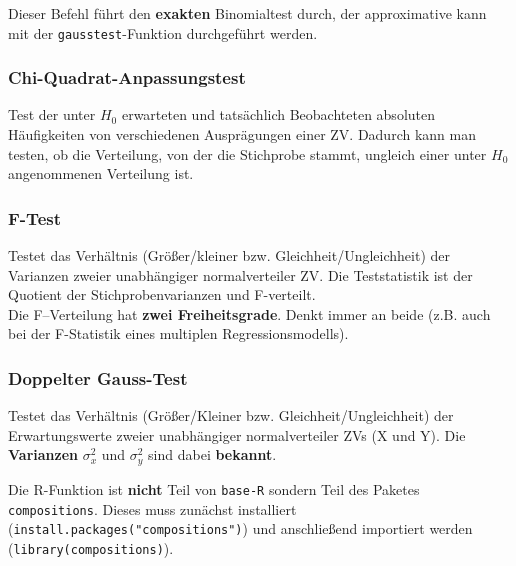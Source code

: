 \documentclass[a4paper]{article}
\newcommand\dangersign[1][2ex]{%
  \renewcommand\stacktype{L}%
  \scaleto{\stackon[1.3pt]{\color{red}$\triangle$}{\tiny !}}{#1}%
}
\begin{document}
\noindent \dangersign[3ex] Dieser Befehl führt den \textbf{exakten} Binomialtest durch, der approximative kann mit der \texttt{gausstest}-Funktion durchgeführt werden.

\subsubsection{Chi-Quadrat-Anpassungstest}\label{sec:chitest1}
Test der unter $H_0$ erwarteten und tatsächlich Beobachteten absoluten Häufigkeiten von verschiedenen Ausprägungen einer ZV. Dadurch kann man testen, ob die Verteilung, von der die Stichprobe stammt, ungleich einer unter $H_0$ angenommenen Verteilung ist.

\subsubsection{F-Test}\label{sec:ftest}
Testet das Verhältnis (Größer/kleiner bzw. Gleichheit/Ungleichheit) der Varianzen zweier unabhängiger normalverteiler ZV. Die Teststatistik ist der Quotient der Stichprobenvarianzen und F-verteilt.\\

\noindent \dangersign[3ex] Die F--Verteilung hat \textbf{zwei Freiheitsgrade}. Denkt immer an beide (z.B. auch bei der F-Statistik eines multiplen Regressionsmodells).\\

\noindent {}

\subsubsection{Doppelter Gauss-Test}\label{sec:Gausstest2}
Testet das Verhältnis (Größer/Kleiner bzw. Gleichheit/Ungleichheit) der Erwartungswerte zweier unabhängiger normalverteiler ZVs (X und Y). Die \textbf{Varianzen} $\sigma_x^2$ und $\sigma_y^2$ sind dabei \textbf{bekannt}.\\

\noindent {}

\noindent \dangersign[3ex] Die R-Funktion ist \textbf{nicht} Teil von \texttt{base-R} sondern Teil des Paketes \texttt{compositions}. Dieses muss zunächst installiert (\texttt{install.packages("compositions")}) und anschließend importiert werden (\texttt{library(compositions)}). 
\end{document}
